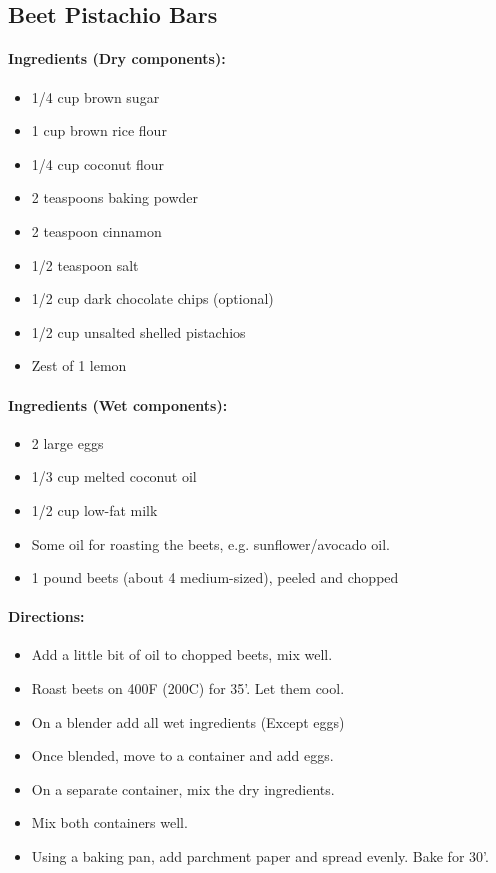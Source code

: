 \documentclass{article}
\begin{document}
\subsection{Beet Pistachio Bars}

\paragraph{Ingredients (Dry components):}
\begin{itemize}
	\item 1/4 cup brown sugar
	\item 1 cup brown rice flour
	\item 1/4 cup coconut flour
	\item 2 teaspoons baking powder
	\item 2 teaspoon cinnamon
	\item 1/2 teaspoon salt
	\item 1/2 cup dark chocolate chips (optional)
	\item 1/2 cup unsalted shelled pistachios
	\item Zest of 1 lemon
\end{itemize}

\paragraph{Ingredients (Wet components):}
\begin{itemize}
	\item 2 large eggs
	\item 1/3 cup melted coconut oil
	\item 1/2 cup low-fat milk
	\item Some oil for roasting the beets, e.g. sunflower/avocado oil.
	\item 1 pound beets (about 4 medium-sized), peeled and chopped
\end{itemize}

\paragraph{Directions:}
\begin{itemize}
	\item Add a little bit of oil to chopped beets, mix well.
	\item Roast beets on 400F (200C) for 35'. Let them cool.
	\item On a blender add all wet ingredients (Except eggs)
	\item Once blended, move to a container and add eggs.
	\item On a separate container, mix the dry ingredients.
	\item Mix both containers well.
	\item Using a baking pan, add parchment paper and spread evenly. Bake for 30'.
\end{itemize}
\end{document}
